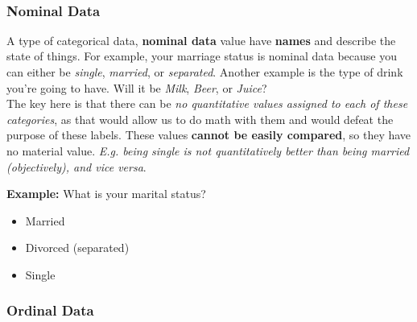 \documentclass[english, 10pt]{article}
\begin{document}
{ \\
}

\subsubsection{Nominal Data}

A type of categorical data, \textbf{nominal data} value have \textbf{names} and describe the state of things. For example, your marriage status is nominal data because you can either be \textit{single}, \textit{married}, or \textit{separated}. Another example is the type of drink you're going to have. Will it be \textit{Milk}, \textit{Beer}, or \textit{Juice}?\\

The key here is that there can be \textit{no quantitative values assigned to each of these categories}, as that would allow us to do math with them and would defeat the purpose of these labels. These values \textbf{cannot be easily compared}, so they have no material value. \textit{E.g. being single is not quantitatively better than being married (objectively), and vice versa}.\\

\begin{myproof}
\textbf{Example:} What is your marital status?
\begin{itemize}
	\item Married
	\item Divorced (separated)
	\item Single
\end{itemize}
\end{myproof}

\subsubsection{Ordinal Data}
\end{document}
